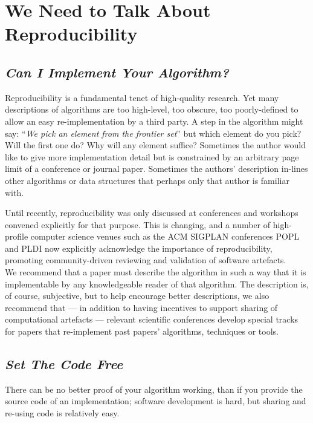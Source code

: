 \documentclass[a4paper,11pt]{article}
\begin{document}
\section{We Need to Talk About Reproducibility}

\subsection{{\emph{Can I Implement Your Algorithm?}}}

Reproducibility is a fundamental tenet of high-quality research. Yet
many descriptions of algorithms are too high-level, too obscure, too
poorly-defined to allow an easy re-implementation by a third party. A
step in the algorithm might say: ``{\emph{We pick an element from the
frontier set}}'' but which element do you pick? Will the first one do?
Why will any element suffice? Sometimes the author would like to give
more implementation detail but is constrained by an arbitrary page
limit of a conference or journal paper. Sometimes the authors'
description in-lines other algorithms or data structures that perhaps
only that author is familiar with.

Until recently, reproducibility was only discussed at conferences and
workshops convened explicitly for that purpose. This is changing, and
a number of high-profile computer science venues such as the ACM
SIGPLAN conferences POPL and PLDI now explicitly acknowledge the
importance of reproducibility, promoting community-driven reviewing
and validation of software artefacts. \\

 We recommend that a
paper must describe the algorithm in such a way that it is
implementable by any knowledgeable reader of that algorithm. The
description is, of course, subjective, but to help encourage better
descriptions, we also recommend that --- in addition to having
incentives to support sharing of computational artefacts --- relevant
scientific conferences develop special tracks for papers that
re-implement past papers' algorithms, techniques or tools.

\subsection{{\emph{Set The Code Free}}}

There can be no better proof of your algorithm working, than if you
provide the source code of an implementation; software development is
hard, but sharing and re-using code is relatively easy.
\end{document}
